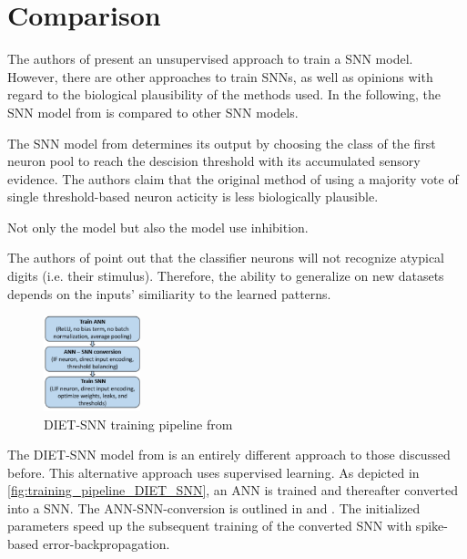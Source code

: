 \section{Comparison}
\label{sec:comparison}

The authors of \cite{SNN}  present an unsupervised approach to train a \ac{SNN} model.
However, there are other approaches to train \acp{SNN}, as well as opinions with regard to the biological plausibility of the methods used.
In the following, the \ac{SNN} model from \cite{SNN} is compared to other \ac{SNN} models.


The \ac{SNN} model from \cite{STDP_like} determines its output by 
choosing the class of the first neuron pool to reach the descision threshold with its accumulated sensory evidence.
The authors claim that the original method of using a majority vote of single threshold-based neuron acticity is less biologically plausible.

Not only the \cite{STDP_like} model but also the \cite{SNN} model use inhibition.

The authors of \cite{STDP_like} point out that the classifier neurons will not recognize atypical digits (i.e. their stimulus).
Therefore, the ability to generalize on new datasets depends on the inputs' similiarity to the learned patterns.



\begin{figure}
    \centering
    \vspace{-20pt}
    \includegraphics[width=0.25\textwidth]{pictures/DIET_SNN_pipeline.jpg}
    \caption{\acs{DIET}-\ac{SNN} training pipeline from \cite{DIET_SNN}}
    \label{fig:training_pipeline_DIET_SNN}
\end{figure}

The \ac{DIET}-\ac{SNN} model from \cite{DIET_SNN} is an entirely different approach to those discussed before.
This alternative approach uses supervised learning.
As depicted in \autoref{fig:training_pipeline_DIET_SNN}, an \ac{ANN} is trained and thereafter converted into a \ac{SNN}.
The \ac{ANN}-\ac{SNN}-conversion is outlined in \cite{DIET_SNN} and \cite{ANN_SNN_conversion}.
The initialized parameters speed up the subsequent training of the converted \ac{SNN} with spike-based error-backpropagation.

